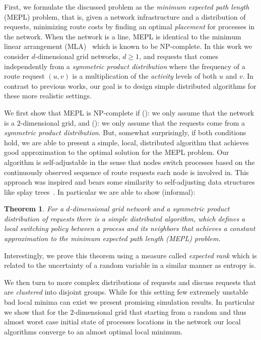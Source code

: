\documentclass[conference]{IEEEtran}
\newcommand{\rmnum}[1]{\romannumeral #1}
\newtheorem*{theorem*}{Theorem}
\begin{document}
First, we formulate the discussed problem as the \emph{minimum expected path length} (MEPL) problem, that is, given a network infrastructure and a distribution of requests, minimizing route costs by finding an optimal \emph{placement} for processes in the network.
When the network is a line, MEPL is identical to the minimum linear arrangement (MLA)~\cite{johnson1979computers} which is known to be NP-complete.
In this work we consider $d$-dimensional grid networks, $d\ge1$, and requests that comes independently from a \emph{symmetric product distribution} where the frequency of a route request $(u,v)$ is a multiplication of the \emph{activity} levels of both $u$ and $v$. 
In contrast to previous works, our goal is to design simple distributed algorithms for these more realistic settings.

We first show that MEPL is NP-complete if (\rmnum{1}): we only assume that the network is a $2$-dimensional grid, and (\rmnum{2}): we only assume that the requests come from a \emph{symmetric product distribution}.
But, somewhat surprisingly, if both conditions hold, we are able to present a simple, local, distributed algorithm that achieves good approximation to the optimal solution for the MEPL problem.
Our algorithm is self-adjustable in the sense that nodes switch processes based on the continuously observed sequence of route requests each node is involved in. This approach was inspired and bears some similarity to self-adjusting data structures like splay trees~\cite{sleator1985self}. In particular we are able to show (informal):
\begin{theorem*} For a \emph{$d$-dimensional grid} network and a \emph{symmetric product distribution} of requests there is a simple distributed algorithm, which defines a local switching policy between a process and its neighbors that achieves a \emph{constant} approximation to the minimum expected path length (MEPL) problem.
\end{theorem*}
Interestingly, we prove this theorem using a measure called \emph{expected rank} which is related to the uncertainty of a random variable in a similar manner as entropy is.

We then turn to more complex distributions of requests and discuss requests that are \emph{clustered} into disjoint groups. While for this setting few extremely unstable bad local minima can exist we present promising simulation results. In particular we show that for the $2$-dimensional grid that starting from a random and thus almost worst case initial state of processes locations in the network our local algorithms converge to an almost optimal local minimum. 
\end{document}
